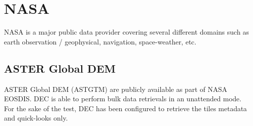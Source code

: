 \documentclass[dec_sum_main.tex]{subfiles}
\begin{document}
\pagebreak

\section{NASA}
NASA is a major public data provider covering several different domains such as earth observation / geophysical, navigation, space-weather, etc.\newline  

\subsection{ASTER Global DEM}
ASTER Global DEM (ASTGTM) are publicly available as part of NASA EOSDIS. DEC is able to perform bulk data retrievals in an unattended mode. For the sake of the test, DEC has been configured to retrieve the tiles metadata and quick-looks only.\newline

\end{document}
